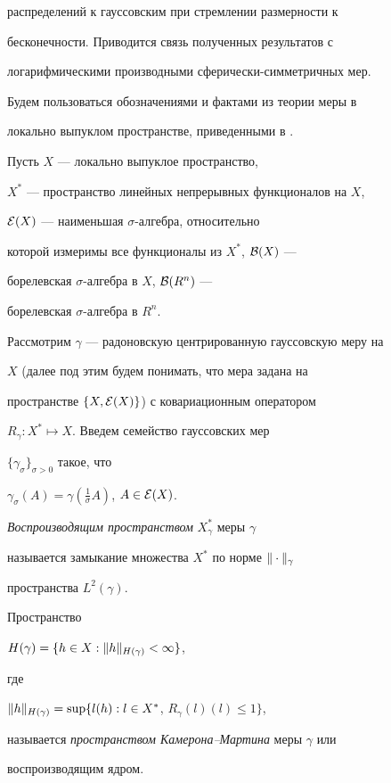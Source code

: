 распределений к гауссовским при стремлении размерности к


бесконечности. Приводится связь полученных результатов с


логарифмическими производными сферически-симметричных мер.





Будем пользоваться обозначениями и фактами из теории меры в 


локально выпуклом пространстве, приведенными в \cite{Bogach}.


Пусть $X$ --- локально выпуклое пространство,


$X^*$ --- пространство линейных непрерывных функционалов на $X$,


${\cal E}(X)$ --- наименьшая $\sigma$-алгебра, относительно


которой измеримы все функционалы из $X^*$, ${\cal B}(X)$ ---


борелевская $\sigma$-алгебра в $X$, ${\cal B}(R^n)$ ---


борелевская $\sigma$-алгебра в $R^n$.





Рассмотрим $\gamma$ --- радоновскую центрированную гауссовскую меру на


$X$ (далее под этим будем понимать, что мера задана на


пространстве $\{X,{\cal E}(X)\}$) с ковариационным оператором


$R_\gamma:X^*\mapsto X$. Введем семейство гауссовских мер


$\{\gamma_\sigma\}_{\sigma>0}$ такое, что


$\gamma_\sigma(A)=\gamma(\frac1\sigma A)$, $A\in{\cal E}(X)$.








\begin{defn}


{\it Воспроизводящим пространством} $X^*_\gamma$ меры $\gamma$


называется замыкание множества $X^*$ по норме $\|\cdot\|_\gamma$


пространства $L^2(\gamma)$.


Пространство


$H(\gamma)=\{h\in X : \|h\|_{H(\gamma)}<\infty\}$,


где


$\|h\|_{H(\gamma)}=\sup\{l(h):l\in X^*$, $R_\gamma(l)(l)\le1\}$,


называется {\it пространством Камерона--Мартина} меры $\gamma$ или 


воспроизводящим ядром.


\end{defn}






